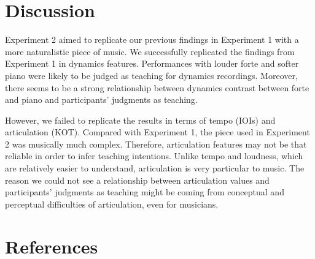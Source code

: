\documentclass[
  man,floatsintext]{apa6}
\begin{document}
\hypertarget{discussion-1}{%
\section{Discussion}\label{discussion-1}}

Experiment 2 aimed to replicate our previous findings in Experiment 1 with a more naturalistic piece of music. We successfully replicated the findings from Experiment 1 in dynamics features. Performances with louder forte and softer piano were likely to be judged as teaching for dynamics recordings. Moreover, there seems to be a strong relationship between dynamics contrast between forte and piano and participants' judgments as teaching.

However, we failed to replicate the results in terms of tempo (IOIs) and articulation (KOT). Compared with Experiment 1, the piece used in Experiment 2 was musically much complex. Therefore, articulation features may not be that reliable in order to infer teaching intentions. Unlike tempo and loudness, which are relatively easier to understand, articulation is very particular to music. The reason we could not see a relationship between articulation values and participants' judgments as teaching might be coming from conceptual and perceptual difficulties of articulation, even for musicians.

\newpage

\hypertarget{references}{%
\section{References}\label{references}}

\begingroup
\setlength{\parindent}{-0in}
\setlength{\leftskip}{0in}
\end{document}
